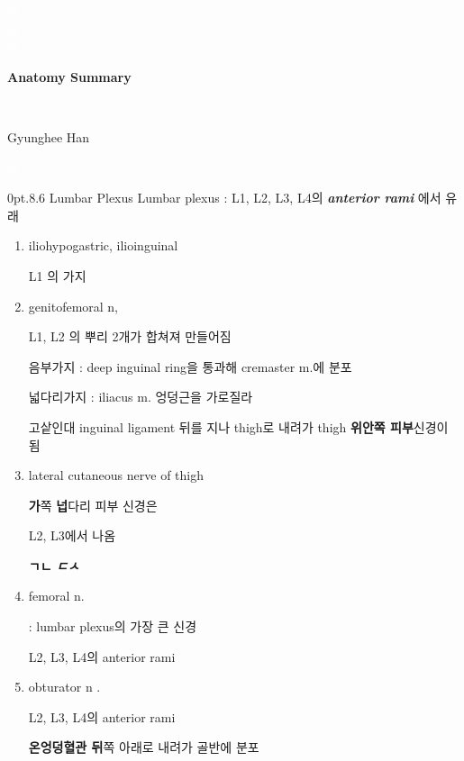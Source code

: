\documentclass[10pt]{amsart}
\makeatletter
\newcommand{\reqnomode}{\tagsleft@false\let\veqno\@@eqno}\makeatother
\newcommand{\linebreakc}{\textcolor{white}{bl}\\}
\numberwithin{theorem}{section}
\numberwithin{example}{section}
\theoremstyle{definition}
\theoremstyle{remark}
\renewcommand\section{\@startsection{section}{1}%
{0pt}{.8\linespacing\@plus\linespacing}{.6\linespacing}%
{\LARGE\bfseries\color{black}}}
\makeatother
\begin{document}
 \reqnomode
{}

\begin{center}
\linebreakc
\linebreakc
\linebreakc
\huge

\textbf{Anatomy Summary}

\textcolor{white}{bl}\\

\Large

Gyunghee Han

\end{center}

\textcolor{white}{bl}\\

\normalsize




\section{ Lumbar Plexus}
Lumbar plexus : L1, L2, L3, L4의 \textit{ \textbf{anterior rami}} 에서 유래 
\begin{enumerate}
\item 
iliohypogastric, ilioinguinal

L1 의 가지 
\item 
genitofemoral n, 


L1, L2 의 뿌리 2개가 합쳐져 만들어짐 


음부가지 
: deep inguinal ring을 통과해 
cremaster m.에 분포 

넓다리가지 
: iliacus m. 엉덩근을 가로질라 

고샅인대 inguinal ligament 뒤를 지나 thigh로 내려가 thigh \textbf{위안쪽 피부}신경이 됨 

\item lateral cutaneous nerve of thigh 

\textbf{가}쪽 \textbf{넙}다리 피부 신경은 

L2, L3에서 나옴 

\textbf{ㄱㄴ} \textit{\textbf{ㄷㅅ}} 
    \item femoral n. 
    
    : lumbar plexus의 가장 큰 신경
    
    L2, L3, L4의 anterior rami 
    
    \item  obturator n .
    
    L2, L3, L4의 anterior rami 
    
    \textbf{온엉덩혈관 뒤}\textit{}쪽 아래로 내려가 골반에 분포 
\end{enumerate}
\end{document}
